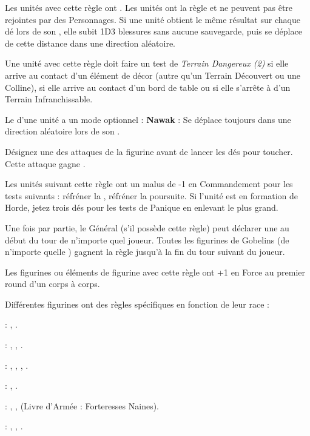 

\armyspecialrules


Les unités avec cette règle ont . Les unités \shambolic{} ont la règle \immunetopsychology et ne peuvent pas être rejointes par des Personnages. Si une unité obtient le même résultat sur chaque dé lors de son \randommovement{}, elle subit 1D3 blessures sans aucune sauvegarde, puis se déplace de cette distance dans une direction aléatoire.

Une unité avec cette règle doit faire un test de \emph{Terrain Dangereux (2)} si elle arrive au contact d'un élément de décor (autre qu'un Terrain Découvert ou une Colline), si elle arrive au contact d'un bord de table ou si elle s'arrête à  d'un Terrain Infranchissable.

Le \randommovement{} d'une unité \shambolic{} a un mode optionnel :
\newline \textbf{Nawak} : Se déplace toujours dans une direction aléatoire lors de son \randommovement{}.

\armyspecialruleentry{\venomousfangs}

Désignez une des attaques de la figurine avant de lancer les dés pour toucher. Cette attaque gagne \multiplewounds{\ordnance}{}.

\armyspecialruleentry{\unruly}

Les unités suivant cette règle ont un malus de -1 en Commandement pour les tests suivants : réfréner la \frenzy , réfréner la poursuite. Si l'unité est en formation de Horde, jetez trois dés pour les tests de Panique en enlevant le plus grand.

\armyspecialruleentry{\greentide}

Une fois par partie, le Général (s'il possède cette règle) peut déclarer une \greentide au début du tour de n'importe quel joueur. Toutes les figurines de Gobelins (de n'importe quelle \greenhideraces) gagnent la règle \fightinextrarank jusqu'à la fin du tour suivant du joueur.

\armyspecialruleentry{\borntofight}

Les figurines ou éléments de figurine avec cette règle ont +1 en Force au premier round d'un corps à corps.

\armyspecialruleentry{\greenhideraces}

Différentes figurines ont des règles spécifiques en fonction de leur race :
\begin{customdescription}
	\item[\Orquea :] \unruly, \borntofight.
	\item[\Orqueb :] \immunetopsychology, \weaponmaster, \borntofight.
	\item[\Orquec :] \frenzy, \unruly, \borntofight, .
	\item[\goba :] \unruly, \insignificant.
	\item[\gobb :] \unruly, \insignificant, \hatred (Livre d'Armée : Forteresses Naines).
	\item[\gobc :] , \unruly, \insignificant.
\end{customdescription}

